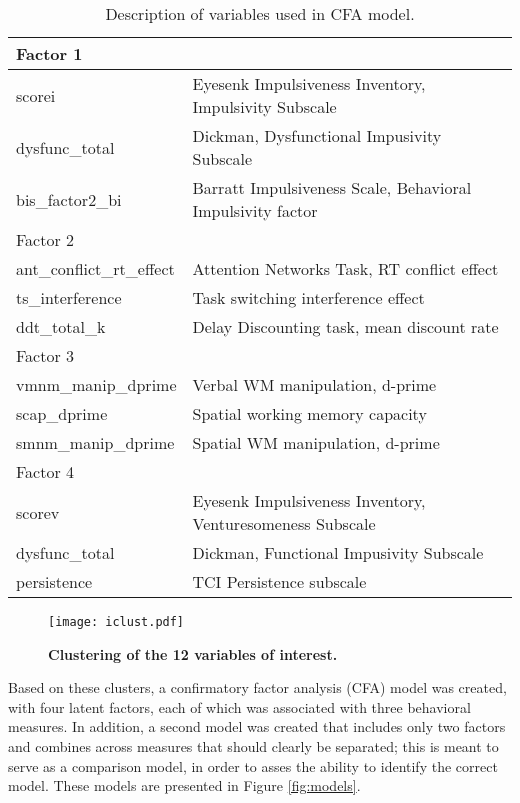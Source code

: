 \documentclass[11pt, oneside]{article}   	%
\begin{document}
\begin{table}[ht]
\caption{Description of variables used in CFA model.}
\begin{center}
\begin{tabular}{|l|l|}
\hline
Factor 1& \\
\hline
scorei & Eyesenk Impulsiveness Inventory, Impulsivity Subscale\\
dysfunc\_total & Dickman, Dysfunctional Impusivity Subscale\\
bis\_factor2\_bi & Barratt Impulsiveness Scale, Behavioral Impulsivity factor\\
\hline
Factor 2& \\
\hline
ant\_conflict\_rt\_effect & Attention Networks Task, RT conflict effect\\
ts\_interference & Task switching interference effect\\
ddt\_total\_k & Delay Discounting task, mean discount rate\\
\hline
Factor 3& \\
\hline
vmnm\_manip\_dprime & Verbal WM manipulation, d-prime\\
scap\_dprime & Spatial working memory capacity \\
smnm\_manip\_dprime & Spatial WM manipulation, d-prime\\
\hline
Factor 4& \\
\hline
scorev & Eyesenk Impulsiveness Inventory, Venturesomeness Subscale\\
dysfunc\_total & Dickman, Functional Impusivity Subscale\\
persistence & TCI Persistence subscale\\
\hline
\end{tabular}
\end{center}
\label{tab:measures}
\end{table}%

\begin{figure}[!h]
\caption{\textbf{Clustering of the 12 variables of interest.}}
\centering
\texttt{[image: iclust.pdf]}
\label{fig:cluster}
\end{figure}

Based on these clusters, a confirmatory factor analysis (CFA) model was created, with four latent factors, each of which was associated with three behavioral measures.  In addition, a second model was created that includes only two factors and combines across measures that should clearly be separated; this is meant to serve as a comparison model, in order to asses the ability to identify the correct model.  These models are presented in Figure \ref{fig:models}.
\end{document}
